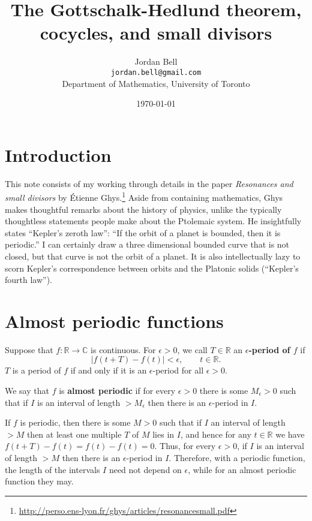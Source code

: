 \documentclass{article}
\theoremstyle{definition}
\begin{document}
\title{The Gottschalk-Hedlund theorem, cocycles, and small divisors}
\author{Jordan Bell\\ \texttt{jordan.bell@gmail.com}\\Department of Mathematics, University of Toronto}
\date{\today}

\maketitle

\section{Introduction}
This note consists of my working through details in the paper {\em Resonances and small divisors} by \'Etienne Ghys.\footnote{\url{http://perso.ens-lyon.fr/ghys/articles/resonancesmall.pdf}} Aside from containing mathematics, Ghys makes thoughtful remarks about the history of physics, unlike the typically thoughtless statements 
people make about the Ptolemaic system. He insightfully states ``Kepler's zeroth law'': ``If the orbit of a planet is bounded, then it is
periodic.'' I can certainly draw a three dimensional bounded curve that is not closed, but that curve is not the orbit of a planet. It is also intellectually lazy to scorn Kepler's correspondence between
orbits and the Platonic solids (``Kepler's fourth law'').

\section{Almost periodic functions}
Suppose that $f:\mathbb{R} \to \mathbb{C}$ is continuous. For $\epsilon>0$, we call $T \in \mathbb{R}$ an \textbf{$\epsilon$-period of $f$} if 
\[
|f(t+T)-f(t)|<\epsilon, \qquad t \in \mathbb{R}.
\]
$T$ is a period of $f$ if and only if it is an $\epsilon$-period for all $\epsilon>0$.

We say that $f$ is \textbf{almost periodic} if for every $\epsilon>0$ there is some $M_\epsilon>0$ such that if $I$ is an interval 
of length $>M_\epsilon$ then there is an $\epsilon$-period in $I$.

If $f$ is periodic, then there is some $M>0$ such that if $I$ an interval of length $>M$ then at least one multiple $T$ of $M$ lies in $I$, and hence
for any $t \in \mathbb{R}$ we have $f(t+T) - f(t)=f(t)-f(t)=0$. Thus, for every $\epsilon>0$, if $I$ is an interval of length $>M$ then there is an
$\epsilon$-period in $I$. Therefore, with a periodic function, the length of the intervals $I$ need not depend on $\epsilon$, while for an almost
periodic function they may.
\end{document}
